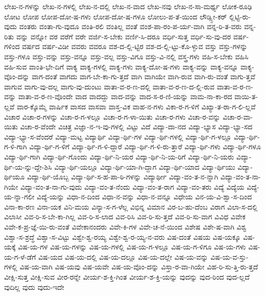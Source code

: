 {ಲೇಖ-ನ-ಗಳನ್ನು
ಲೇಖ-ನ-ಗಳಲ್ಲಿ
ಲೇಖ-ನ-ದಲ್ಲಿ
ಲೇಖ-ನ-ವಾದ
ಲೇಖ-ನವು
ಲೇಖ-ನ-ಸಾ-ಮರ್ಥ್ಯ
ಲೋಕ-ರೂಢಿ
ಲೋಟ
ಲೋಪ
ಲೋಪ-ದೋ-ಷ-ಗಳು
ಲೋಪ-ದೋ-ಷ-ಗಳೂ
ಲೋಲು-ಪ-ತೆ-ಯಿಂದ
ಲೌಡ್ಸ್ಪೀ-ಕರ್
ಲ್ಲಿಟ್ಟಿ-ರು-ವುದು
ವಂತರು
ವಂತಾ-ಗು-ವುದೂ
ವಂತಿ-ರಲಿ
ವಂತಿಲ್ಲ
ವಂತೆ
ವಂಶ-ಪಾ-ರಂ-ಪ-ರ್ಯ-ವಾಗಿ
ವನ್ನ-ರಿ-ತ-ವರು
ವನ್ನ-ರಿತು
ವನ್ನು
ವನ್ನೋ
ವರ
ವರೆಗೆ
ವರೇ
ವರ್ಜಿ-ಸ-ಬೇಕು
ವರ್ಣಿ-ಸಿ-ದರೂ
ವರ್ಧಿ-ಸುತ್ತ
ವರ್ಧಿ-ಸು-ವು-ದರ
ವರ್ಷ-ಗಳಿಂದ
ವರ್ಷದ
ವರ್ಷ-ವಿಡೀ
ವವರು
ವವರೂ
ವಶ-ದ-ಲ್ಲಿ-ಟ್ಟಿರ
ವಶ-ದ-ಲ್ಲಿ-ಟ್ಟು-ಕೊ-ಳ್ಳುವ
ವಸ್ತು
ವಸ್ತು-ಗಳನ್ನು
ವಸ್ತು-ಗಳೂ
ವಸ್ತು-ವನ್ನು
ವಸ್ತು-ವನ್ನೂ
ವಸ್ತು-ವಲ್ಲ
ವಸ್ತು-ವಿಗೂ
ವಸ್ತು-ವಿ-ನಲ್ಲಿ
ವಸ್ತ್ರ-ಗಳು
ವಹಿ-ಸ-ಬೇಕು
ವಹಿಸಿ
ವಹಿ-ಸುವ
ವಾಂತಿ-ಭೇ-ದಿಗೆ
ವಾಕ್ಯ
ವಾಕ್ಯ-ಗಳಲ್ಲಿ
ವಾಕ್ಯ-ಗಳು
ವಾಕ್ಯ-ದೋ-ಷ-ಗಳು
ವಾಕ್ಯ-ವನ್ನು
ವಾಕ್ಯ-ವನ್ನೂ
ವಾಕ್ಯ-ವೊಂ-ದನ್ನು
ವಾಗ-ದಂತೆ
ವಾಗದು
ವಾಗ-ಬೇ-ಕಾ-ಗು-ತ್ತದೆ
ವಾಗಿ
ವಾಗಿಯೇ
ವಾಗಿ-ರುವ
ವಾಗಿ-ರು-ವಂತೆ
ವಾಗು-ತ್ತವೆ
ವಾಗುವ
ವಾಗು-ವು-ದಲ್ಲ
ವಾಗು-ವು-ದುಂಟು
ವಾತಾ-ವ-ರ-ಣ-ದಲ್ಲಿ
ವಾತಾ-ವ-ರ-ಣ-ದ-ಲ್ಲಿ-ರುವ
ವಾತಾ-ವ-ರ-ಣ-ವನ್ನು
ವಾತಾ-ವ-ರ-ಣ-ವೊಂದೇ
ವಾದ
ವಾದದ್ದು
ವಾದ-ವನ್ನು
ವಾದ-ಸ-ರ-ಣಿ-ಯನ್ನು
ವಾಮ-ನಾ-ಕಾ-ರದ
ವಾಯಿ-ತ-ಲ್ಲವೆ
ವಾರ-ಕ್ಕೊಮ್ಮೆ
ವಾರ್ಷಿಕ
ವಾಸದ
ವಾಸವಾ
ವಾಸ್ತ-ವಿಕ
ವಾಹ-ನ-ಗಳು
ವಿಕಾ-ರ-ಗ-ಳಿಗೆ
ವಿಖ್ಯಾ-ತ-ರಾ-ಗ-ಲಿ-ಲ್ಲವೆ
ವಿಚಾರ
ವಿಚಾ-ರ-ಗಳನ್ನು
ವಿಚಾ-ರ-ಗ-ಳಲ್ಲೂ
ವಿಚಾ-ರ-ಗ-ಳಾ-ಯಿತು
ವಿಚಾ-ರ-ಗಳು
ವಿಚಾ-ರ-ವನ್ನು
ವಿಚಾ-ರ-ವಾ-ಯಿತು
ವಿಚಾ-ರ-ವೆಂದೇ
ವಿಚಿತ್ರ
ವಿಜ್ಞಾ-ನ-ಇ-ವು-ಗಳಲ್ಲಿ
ವಿಟ್ಟು
ವಿದೆ
ವಿದ್ಯಾ-ದಾ-ನದ
ವಿದ್ಯಾ-ಭ್ಯಾಸ
ವಿದ್ಯಾ-ಭ್ಯಾ-ಸದ
ವಿದ್ಯಾ-ಭ್ಯಾ-ಸ-ವೆಂದರೆ
ವಿದ್ಯಾ-ಮಟ್ಟ
ವಿದ್ಯಾರ್ಥಿ
ವಿದ್ಯಾ-ರ್ಥಿ-ಗಳ
ವಿದ್ಯಾ-ರ್ಥಿ-ಗಳಲ್ಲಿ
ವಿದ್ಯಾ-ರ್ಥಿ-ಗ-ಳಲ್ಲೂ
ವಿದ್ಯಾ-ರ್ಥಿ-ಗ-ಳಿ-ಗಾಗಿ
ವಿದ್ಯಾ-ರ್ಥಿ-ಗ-ಳಿಗೆ
ವಿದ್ಯಾ-ರ್ಥಿ-ಗ-ಳಿ-ದ್ದಾರೆ
ವಿದ್ಯಾ-ರ್ಥಿ-ಗ-ಳಿ-ರು-ತ್ತಾರೆ
ವಿದ್ಯಾ-ರ್ಥಿ-ಗಳು
ವಿದ್ಯಾ-ರ್ಥಿ-ಗಳೂ
ವಿದ್ಯಾ-ರ್ಥಿ-ಗಾಗಿ
ವಿದ್ಯಾ-ರ್ಥಿ-ಗೊಂದು
ವಿದ್ಯಾ-ರ್ಥಿ-ನಿ-ಯರ
ವಿದ್ಯಾ-ರ್ಥಿ-ನಿ-ಯ-ರಿಗೆ
ವಿದ್ಯಾ-ರ್ಥಿ-ನಿ-ಯರು
ವಿದ್ಯಾ-ರ್ಥಿ-ಯ-ನ್ನು-ದ್ದೇ-ಶಿಸಿ
ವಿದ್ಯಾ-ರ್ಥಿ-ಯಲ್ಲೂ
ವಿದ್ಯಾ-ರ್ಥಿ-ಯಾ-ಗಿ-ದ್ದಾಗ
ವಿದ್ಯಾ-ರ್ಥಿ-ಯಾದ
ವಿದ್ಯಾ-ರ್ಥಿಯು
ವಿದ್ಯಾ-ರ್ಥಿಯೂ
ವಿದ್ಯಾ-ರ್ಥಿ-ಯೊಬ್ಬ
ವಿದ್ಯಾ-ರ್ಥಿ-ಸ-ಹ-ಪಾ-ಠಿ-ಗಳನ್ನು
ವಿದ್ಯಾರ್ಥೀ
ವಿದ್ಯಾ-ವಂ-ತ-ನ-ನ್ನಾಗಿ
ವಿದ್ಯಾ-ವಂ-ತ-ನಾ-ಗಿಯೇ
ವಿದ್ಯಾ-ವಂ-ತ-ನಾ-ಗು-ವುದು
ವಿದ್ಯಾ-ವಂ-ತ-ನೆಂದು
ವಿದ್ಯಾ-ವಂ-ತ-ರಾಗ
ವಿದ್ಯಾ-ವಂ-ತರು
ವಿದ್ಯೆ
ವಿದ್ಯೆಯ
ವಿದ್ಯೆ-ಯ-ನ್ನಾ-ಗಲೀ
ವಿದ್ಯೆ-ಯನ್ನು
ವಿಧಾ-ನ-ದಿಂದ
ವಿಧಾ-ನ-ವನ್ನು
ವಿಧಾ-ನ-ವನ್ನೂ
ವಿಧೇಯ
ವಿನ-ಯ-ವಿ-ಶ್ವಾ-ಸ-ದಿಂದ
ವಿನಾ-ಕಾ-ರಣ
ವಿನಾ-ಯಕ
ವಿನಿ-ಮಯ
ವಿನ್ಯಾ-ಸ-ಗ-ಳೆಲ್ಲ
ವಿಭಿನ್ನ
ವಿಮಾನ
ವಿರ-ಬ-ಹು-ದೆಂಬ
ವಿರಾಗ
ವಿಲಾ-ಸ-ದಲ್ಲಿ
ವಿಲಾಸೀ
ವಿವ-ರಿ-ಸ-ಬೇ-ಕಾ-ಗಿಲ್ಲ
ವಿವ-ರಿ-ಸ-ಲಾದ
ವಿವ-ರಿಸಿ
ವಿವ-ರಿ-ಸು-ತ್ತದೆ
ವಿವ-ರಿ-ಸು-ವಾಗ
ವಿವಿಧ
ವಿವೇಕ
ವಿವೇ-ಕ-ಪ್ರ-ಜ್ಞೆ-ಯಿ-ರು-ವಂತೆ
ವಿವೇಕಾನಂದರು
ವಿವೇ-ಕಿ-ಗಳ
ವಿವೇ-ಚ-ನೆ-ಯಿಂದ
ವಿಶೇಷ
ವಿಶೇ-ಷ-ವಾಗಿ
ವಿಶ್ವ
ವಿಶ್ವಾ-ಸ-ಶ್ರದ್ಧೆ
ವಿಶ್ವಾ-ಸ-ವಿಟ್ಟು
ವಿಶ್ವೇ-ಶ್ವ-ರಯ್ಯ
ವಿಶ್ವೇ-ಶ್ವ-ರ-ಯ್ಯ-ನ-ವರು
ವಿಷ-ದಂತೆ
ವಿಷಯ
ವಿಷ-ಯಕ್ಕೂ
ವಿಷ-ಯಕ್ಕೆ
ವಿಷ-ಯ-ಗಳ
ವಿಷ-ಯ-ಗಳನ್ನು
ವಿಷ-ಯ-ಗಳಲ್ಲಿ
ವಿಷ-ಯ-ಗ-ಳಲ್ಲೂ
ವಿಷ-ಯ-ಗ-ಳಿಗೂ
ವಿಷ-ಯ-ಗಳು
ವಿಷ-ಯ-ಗ-ಳೆ-ಡೆಗೆ
ವಿಷ-ಯದ
ವಿಷ-ಯ-ದಲ್ಲಿ
ವಿಷ-ಯ-ದಲ್ಲೂ
ವಿಷ-ಯ-ದಲ್ಲೇ
ವಿಷ-ಯ-ವನ್ನು
ವಿಷ-ಯ-ವ-ಸ್ತು-ಗಳಲ್ಲಿ
ವಿಷ-ಯ-ವಾಗಿ
ವಿಷ-ಯವು
ವಿಷ-ಯವೇ
ವಿಷ-ಯ-ವೊಂ-ದನ್ನು
ವಿಸ್ತಾ-ರ-ವಾ-ಗಿಯೇ
ವಿಹ-ರಿ-ಸು-ತ್ತಿ-ರು-ತ್ತದೆ
ವೀಕ್ಷಿ-ಸುತ್ತ
ವೀಕ್ಷಿ-ಸುವ
ವೀರ-ರನ್ನೇ
ವೀರ್ಯ-ಶ-ಕ್ತಿ-ಗಿಂತ
ವೀರ್ಯ-ಶ-ಕ್ತಿ-ಯನ್ನು
ವುದನ್ನು
ವುದ-ರಿಂದ
ವುದ-ಲ್ಲದೆ
ವುದಿಲ್ಲ
ವುದು
ವುದು-ಇದೇ
}
